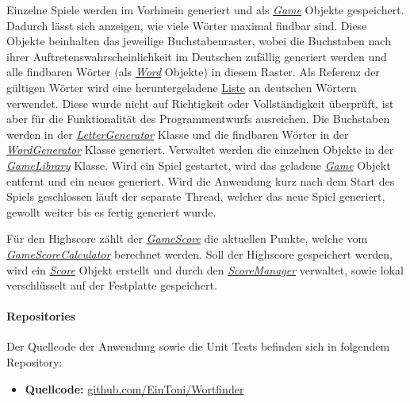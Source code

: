 Einzelne Spiele werden im Vorhinein generiert und als \href{https://github.com/EinToni/Wortfinder/blob/main/Wortfinder/Game.cs}{\textit{Game}} Objekte gespeichert. Dadurch lässt sich anzeigen, wie viele Wörter maximal findbar sind. Diese Objekte beinhalten das jeweilige Buchstabenraster, wobei die Buchstaben nach ihrer Auftretenswahrscheinlichkeit im Deutschen zufällig generiert werden und alle findbaren Wörter (als \href{https://github.com/EinToni/Wortfinder/blob/main/Wortfinder/Word.cs}{\textit{Word}} Objekte) in diesem Raster. Als Referenz der gültigen Wörter wird eine heruntergeladene \href{https://github.com/EinToni/Wortfinder/blob/main/Wortfinder/wordListGerman.txt}{Liste} an deutschen Wörtern verwendet. Diese wurde nicht auf Richtigkeit oder Vollständigkeit überprüft, ist aber für die Funktionalität des Programmentwurfs ausreichen.
Die Buchstaben werden in der \href{https://github.com/EinToni/Wortfinder/blob/main/Wortfinder/LetterGenerator.cs}{\textit{LetterGenerator}} Klasse und die findbaren Wörter in der \href{https://github.com/EinToni/Wortfinder/blob/main/Wortfinder/WordGenerator.cs}{\textit{WordGenerator}} Klasse generiert. Verwaltet werden die einzelnen Objekte in der \href{https://github.com/EinToni/Wortfinder/blob/main/Wortfinder/GameLibrary.cs}{\textit{GameLibrary}} Klasse. 
Wird ein Spiel gestartet, wird das geladene \href{https://github.com/EinToni/Wortfinder/blob/main/Wortfinder/Game.cs}{\textit{Game}} Objekt entfernt und ein neues generiert. Wird die Anwendung kurz nach dem Start des Spiels geschlossen läuft der separate Thread, welcher das neue Spiel generiert, gewollt weiter bis es fertig generiert wurde.


Für den Highscore zählt der \href{https://github.com/EinToni/Wortfinder/blob/main/Wortfinder/GameScore.cs}{\textit{GameScore}} die aktuellen Punkte, welche vom \href{https://github.com/EinToni/Wortfinder/blob/main/Wortfinder/GameScoreCalculator.cs}{\textit{GameScoreCalculator}} berechnet werden. Soll der Highscore gespeichert werden, wird ein \href{https://github.com/EinToni/Wortfinder/blob/main/Wortfinder/Score.cs}{\textit{Score}} Objekt erstellt und durch den \href{https://github.com/EinToni/Wortfinder/blob/main/Wortfinder/ScoreManager.cs}{\textit{ScoreManager}} verwaltet, sowie lokal verschlüsselt auf der Festplatte gespeichert.

\paragraph{Repositories}
Der Quellcode der Anwendung sowie die Unit Tests befinden sich in folgendem Repository:
\begin{itemize}
\item \textbf{Quellcode:} \href{https://github.com/EinToni/Wortfinder}{github.com/EinToni/Wortfinder}
\end{itemize}


